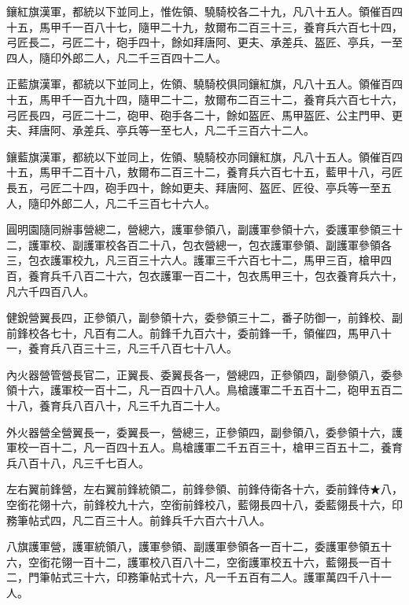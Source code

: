 \begin{pinyinscope}
鑲紅旗漢軍，都統以下並同上，惟佐領、驍騎校各二十九，凡八十五人。領催百四十五，馬甲千一百八十七，隨甲二十九，敖爾布二百三十三，養育兵六百七十四，弓匠長二，弓匠二十，砲手四十，餘如拜唐阿、更夫、承差兵、盔匠、亭兵，一至四人，隨印外郎二人，凡二千三百四十二人。

正藍旗漢軍，都統以下並同上，佐領、驍騎校俱同鑲紅旗，凡八十五人。領催百四十五，馬甲千一百九十四，隨甲二十二，敖爾布二百三十二，養育兵六百七十六，弓匠長四，弓匠二十二，砲甲、砲手各二十，餘如盔匠、馬甲盔匠、公主門甲、更夫、拜唐阿、承差兵、亭兵等一至七人，凡二千三百六十二人。

鑲藍旗漢軍，都統以下並同上，佐領、驍騎校亦同鑲紅旗，凡八十五人。領催百四十五，馬甲千二百十八，敖爾布二百三十二，養育兵六百七十五，藍甲十八，弓匠長五，弓匠二十四，砲手四十，餘如更夫、拜唐阿、盔匠、匠役、亭兵等一至五人，隨印外郎二人，凡二千三百七十六人。

圓明園隨同辦事營總二，營總六，護軍參領八，副護軍參領十六，委護軍參領三十二，護軍校、副護軍校各百二十八，包衣營總一，包衣護軍參領、副護軍參領各三，包衣護軍校九，凡三百三十六人。護軍三千六百七十二，馬甲三百，槍甲四百，養育兵千八百二十六，包衣護軍一百二十，包衣馬甲三十，包衣養育兵六十，凡六千四百八人。

健銳營翼長四，正參領八，副參領十六，委參領三十二，番子防御一，前鋒校、副前鋒校各七十，凡百有二人。前鋒千九百六十，委前鋒一千，領催四，馬甲八十一，養育兵八百三十三，凡三千八百七十八人。

內火器營管營長官二，正翼長、委翼長各一，營總四，正參領四，副參領八，委參領十六，護軍校一百十二，凡一百四十八人。鳥槍護軍二千五百十二，砲甲五百二十八，養育兵八百八十，凡三千九百二十人。

外火器營全營翼長一，委翼長一，營總三，正參領四，副參領八，委參領十六，護軍校一百十二，凡一百四十五人。鳥槍護軍二千五百三十，槍甲三百五十二，養育兵八百十八，凡三千七百人。

左右翼前鋒營，左右翼前鋒統領二，前鋒參領、前鋒侍衛各十六，委前鋒侍★八，空銜花翎十六，前鋒校九十六，空銜前鋒校八，藍翎長四十八，委藍翎長十六，印務筆帖式四，凡二百三十人。前鋒兵千六百六十八人。

八旗護軍營，護軍統領八，護軍參領、副護軍參領各一百十二，委護軍參領五十六，空銜花翎一百十二，護軍校八百八十二，空銜護軍校五十六，藍翎長一百十二，門筆帖式三十六，印務筆帖式十六，凡一千五百有二人。護軍萬四千八十一人。


\end{pinyinscope}
